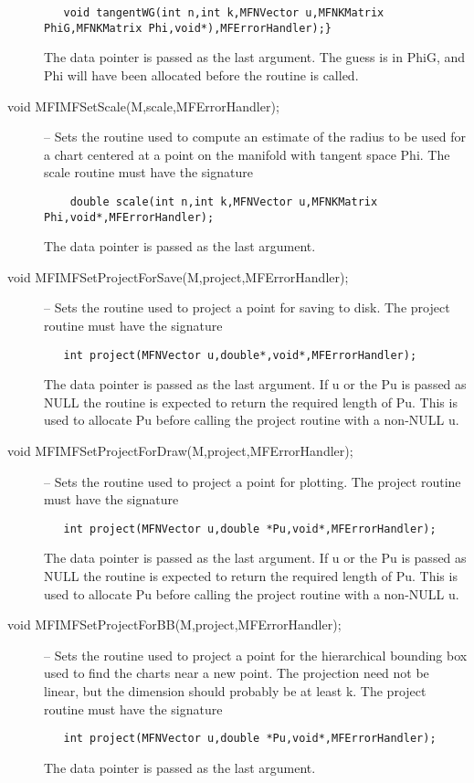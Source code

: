 \documentclass[12pt]{article}
\begin{document}
\begin{description}
\begin{verbatim}
   void tangentWG(int n,int k,MFNVector u,MFNKMatrix PhiG,MFNKMatrix Phi,void*),MFErrorHandler);}
\end{verbatim}
The data pointer is passed as the last argument. The guess is in PhiG, and Phi will have been 
allocated before the routine is called.
\item [void MFIMFSetScale(M,scale,MFErrorHandler);]
-- Sets the routine used to compute an estimate of the radius to be used for a chart centered at
a point on the manifold with tangent space Phi. 
The scale routine must have the signature
\begin{verbatim}
    double scale(int n,int k,MFNVector u,MFNKMatrix Phi,void*,MFErrorHandler);
\end{verbatim}
The data pointer is passed as the last argument.
\item [void MFIMFSetProjectForSave(M,project,MFErrorHandler);]
-- Sets the routine used to project a point for saving to disk. The project routine must have the
signature
\begin{verbatim}
   int project(MFNVector u,double*,void*,MFErrorHandler);
\end{verbatim}
The data pointer is passed as the last argument.
If u or the Pu is passed as NULL the routine is expected to return the required length of 
Pu. This is used to allocate Pu before calling the project routine with a non-NULL u.
\item [void MFIMFSetProjectForDraw(M,project,MFErrorHandler);]
-- Sets the routine used to project a point for plotting. The project routine must have the
signature
\begin{verbatim}
   int project(MFNVector u,double *Pu,void*,MFErrorHandler);
\end{verbatim}
The data pointer is passed as the last argument.
If u or the Pu is passed as NULL the routine is expected to return the required length of 
Pu. This is used to allocate Pu before calling the project routine with a non-NULL u.
\item [void MFIMFSetProjectForBB(M,project,MFErrorHandler);]
-- Sets the routine used to project a point for the hierarchical bounding box used to find
the charts near a new point. The projection need not be linear, but the dimension should 
probably be at least k.
The project routine must have the signature
\begin{verbatim}
   int project(MFNVector u,double *Pu,void*,MFErrorHandler);
\end{verbatim}
The data pointer is passed as the last argument.

\end{description}
\end{document}
